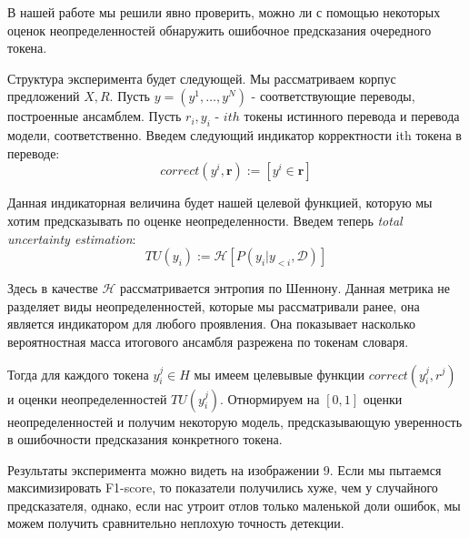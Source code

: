 \documentclass[a4paper,14pt]{extarticle}
\begin{document}
	В нашей работе мы решили явно проверить, можно ли с помощью некоторых оценок неопределенностей обнаружить ошибочное предсказания очередного токена.
	
	Структура эксперимента будет следующей. Мы рассматриваем корпус предложений $X, R$. Пусть $y = (y^1, \dots, y^N)$ - соответствующие переводы, построенные ансамблем. Пусть $r_{i}, y_{i}$ - $ith$ токены истинного перевода и перевода модели, соответственно. Введем следующий индикатор корректности ith токена в переводе:
	\begin{equation}
		correct(y^{i}, \textbf{r}) := [y^{i} \in \textbf{r}]
	\end{equation}
	
	Данная индикаторная величина будет нашей целевой функцией, которую мы хотим предсказывать по оценке неопределенности. Введем теперь \textit{total uncertainty estimation}:
	\begin{equation}
		TU(y_i) := \mathcal{H}[P(y_i|y_{<i}, \mathcal{D})]
	\end{equation}
	
	Здесь в качестве $\mathcal{H}$ рассматривается энтропия по Шеннону. Данная метрика не разделяет виды неопределенностей, которые мы рассматривали ранее, она является индикатором для любого проявления. Она показывает насколько вероятностная масса итогового ансамбля разрежена по токенам словаря.
	
	Тогда для каждого токена $y_i^j \in H$ мы имеем целевывые функции $correct(y_i^j, r^j)$ и оценки неопределенностей $TU(y_i^j)$. Отнормируем на $[0, 1]$ оценки неопределенностей и получим некоторую модель, предсказывающую уверенность в ошибочности предсказания конкретного токена.
	
	\begin{figure}[t]
	\end{figure}
	Результаты эксперимента можно видеть на изображении 9. Если мы пытаемся максимизировать F1-score, то показатели получились хуже, чем у случайного предсказателя, однако, если нас утроит отлов только маленькой доли ошибок, мы можем получить сравнительно неплохую точность детекции. 
	
\end{document}

